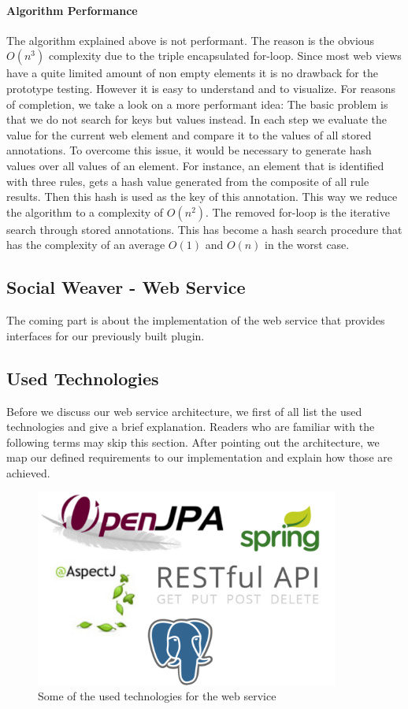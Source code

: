 \paragraph{Algorithm Performance}
The algorithm explained above is not performant. The reason is the obvious $O(n^3)$ complexity due to the triple encapsulated for-loop. Since most web views have a quite limited amount of non empty elements it is no drawback for the prototype testing. However it is easy to understand and to visualize. 
For reasons of completion, we take a look on a more performant idea:
The basic problem is that we do
 not
 search for keys but values instead. In each step we evaluate the value for the current web element and compare it to the values of all stored annotations. To overcome this issue, it would be necessary to generate hash values over all values of an element. 
For instance, an element that is identified with three rules,  gets a hash value generated from the  composite of all rule results. Then this hash is used as the key of this annotation. 
This way we reduce the algorithm to a complexity of $O(n^2)$. The removed for-loop is the iterative search through stored annotations. This has become a hash search procedure that has the complexity of an average $O(1)$ and $O(n)$ in the worst case.

\newpage
\subsection{Social Weaver - Web Service}
The coming part is about the implementation of the web service that provides interfaces for our previously built plugin.

\subsection{Used Technologies}
Before we discuss our web service architecture, we first of all list the used technologies and give a brief explanation. Readers who are familiar with the following terms may skip this section. 
After pointing out the architecture, we map our defined requirements to our implementation and explain how those are achieved.

\begin{figure}\centering
		\includegraphics[width=10cm]{images/ws-technologies-logos.png}
		\caption{Some of the used technologies for the web service}
		\label{ws-technologies-logos}
\end{figure} 

